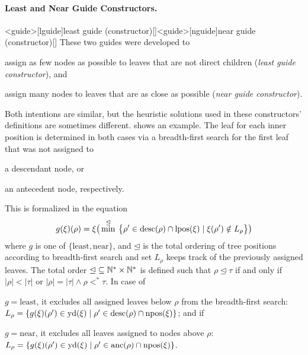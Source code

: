 \documentclass[../../document.tex]{subfiles}
\begin{document}
    \paragraph{Least and Near Guide Constructors.}<guide>[lguide]{least guide (constructor)}[]<guide>[nguide]{near guide (constructor)}[]
    These two guides were developed to
    \begin{inparaenum}
        \item assign as few nodes as possible to leaves that are not direct children (\emph{least guide constructor}), and
        \item assign many nodes to leaves that are as close as possible (\emph{near guide constructor}).
    \end{inparaenum}
    Both intentions are similar, but the heuristic solutions used in these constructors' definitions are sometimes different.
     shows an example.
    The leaf for each inner position is determined in both cases via a breadth-first search for the first leaf that was not assigned to
    \begin{inparaenum}
        \item a descendant node, or
        \item an antecedent node, respectively.
    \end{inparaenum}
    This is formalized in the equation
    \[
    g(\xi)(\rho) = \xi\big( \min^{\unlhd} \: \big\{\rho' \in \operatorname{desc}(\rho) \cap \operatorname{lpos}(\xi) \mid \xi(\rho') \notin L_\rho \big\} \big)
    \]
    where \(g\) is one of \(\{\mathrm{least}, \mathrm{near}\}\), and \(\unlhd\) is the total ordering of tree positions according to breadth-first search and set \(L_\rho\) keeps track of the previously assigned leaves.
    The total order \(\unlhd \subseteq \mathbb{N}^* \times \mathbb{N}^*\) is defined such that \(\rho \unlhd \tau\) if and only if \(|\rho| < |\tau|\) or \(|\rho| = |\tau| \land \rho <^* \tau\).
    In case of
    \begin{inparaenum}
        \item \(g = \mathrm{least}\), it excludes all assigned leaves below \(\rho\) from the breadth-first search:
        \(L_\rho = \{ g(\xi)(\rho') \in \operatorname{yd}(\xi) \mid \rho' \in \operatorname{desc}(\rho) \cap \operatorname{npos}(\xi) \}\); and if
        \item \(g = \mathrm{near}\), it excludes all leaves assigned to nodes above \(\rho\):
        \(L_\rho = \{ g(\xi)(\rho') \in \operatorname{yd}(\xi) \mid \rho' \in \operatorname{anc}(\rho) \cap \operatorname{npos}(\xi) \}\).
    \end{inparaenum}
\end{document}
